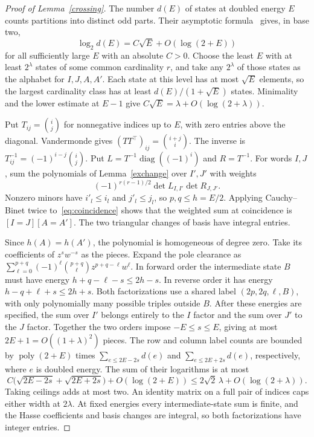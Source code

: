 \documentclass[11pt]{article}
\theoremstyle{remark}
\begin{document}
\begin{proof}[Proof of Lemma~\ref{crossing}]
The number \(d(E)\) of states at doubled energy \(E\) counts partitions into distinct odd parts. Their asymptotic formula~\cite{partitions} gives, in base two,
\[
 \log_2 d(E)=C\sqrt E+O(\log(2+E))
\]
for all sufficiently large \(E\) with an absolute \(C>0\). Choose the least \(E\) with at least \(2^\lambda\) states of some common cardinality \(r\), and take any \(2^\lambda\) of those states as the alphabet for \(I,J,A,A'\). Each state at this level has at most \(\sqrt E\) elements, so the largest cardinality class has at least \(d(E)/(1+\sqrt E)\) states. Minimality and the lower estimate at \(E-1\) give \(C\sqrt E=\lambda+O(\log(2+\lambda))\).

Put \(T_{ij}=\binom ij\) for nonnegative indices up to \(E\), with zero entries above the diagonal. Vandermonde gives \((TT^\top)_{ij}=\binom{i+j}{i}\). The inverse is \(T^{-1}_{ij}=(-1)^{i-j}\binom ij\). Put \(L=T^{-1}\operatorname{diag}((-1)^i)\) and \(R=T^{-1}\). For words \(I,J\), sum the polynomials of Lemma~\ref{exchange} over \(I',J'\) with weights
\[
 (-1)^{r(r-1)/2}\det L_{I,I'}\det R_{J,J'} .
\]
Nonzero minors have \(i'_l\le i_l\) and \(j'_l\le j_l\), so \(p,q\le h=E/2\). Applying Cauchy--Binet twice to~\eqref{eq:coincidence} shows that the weighted sum at coincidence is \([I=J][A=A']\). The two triangular changes of basis have integral entries.

Since \(h(A)=h(A')\), the polynomial is homogeneous of degree zero. Take its coefficients of \(z^s w^{-s}\) as the pieces. Expand the pole clearance as \(\sum_{\ell=0}^{p+q}(-1)^\ell\binom{p+q}{\ell}z^{p+q-\ell}w^\ell\). In forward order the intermediate state \(B\) must have energy \(h+q-\ell-s\le 2h-s\). In reverse order it has energy \(h-q+\ell+s\le 2h+s\). Both factorizations use a shared label \((2p,2q,\ell,B)\), with only polynomially many possible triples outside \(B\). After these energies are specified, the sum over \(I'\) belongs entirely to the \(I\) factor and the sum over \(J'\) to the \(J\) factor. Together the two orders impose \(-E\le s\le E\), giving at most \(2E+1=O((1+\lambda)^2)\) pieces. The row and column label counts are bounded by \(\operatorname{poly}(2+E)\) times \(\sum_{e\le 2E-2s}d(e)\) and \(\sum_{e\le 2E+2s}d(e)\), respectively, where \(e\) is doubled energy. The sum of their logarithms is at most
\[
 C\big(\sqrt{2E-2s}+\sqrt{2E+2s}\big)+O(\log(2+E))
 \le 2\sqrt2\,\lambda+O(\log(2+\lambda)).
\]
Taking ceilings adds at most two. An identity matrix on a full pair of indices caps either width at \(2\lambda\). At fixed energies every intermediate-state sum is finite, and the Hasse coefficients and basis changes are integral, so both factorizations have integer entries.
\end{proof}



\end{document}
